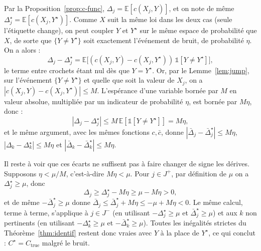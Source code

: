 \documentclass[11pt]{article}
\begin{document}
Par la Proposition~\ref{prop:c-func}, $\Delta_j = \mathbb{E}[c(X_j,Y)]$, et on note de même $\Delta_j^\star = \mathbb{E}[c(X_j,Y^\star)]$. Comme $X$ suit la même loi dans les deux cas (seule l'étiquette change), on peut coupler $Y$ et $Y^\star$ sur le même espace de probabilité que $X$, de sorte que $\{Y\ne Y^\star\}$ soit exactement l'événement de bruit, de probabilité $\eta$. On a alors :
$$\Delta_j - \Delta_j^\star = \mathbb{E}\big[(c(X_j,Y)-c(X_j,Y^\star))\,\mathbb{1}[Y\ne Y^\star]\big],$$
le terme entre crochets étant nul dès que $Y=Y^\star$. Or, par le Lemme~\ref{lem:jump}, sur l'événement $\{Y\ne Y^\star\}$ et quelle que soit la valeur de $X_j$, on a $|c(X_j,Y)-c(X_j,Y^\star)| \le M$. L'espérance d'une variable bornée par $M$ en valeur absolue, multipliée par un indicateur de probabilité $\eta$, est bornée par $M\eta$, donc :
$$|\Delta_j-\Delta_j^\star| \le M\,\mathbb{E}[\mathbb{1}[Y\ne Y^\star]] = M\eta,$$
et le même argument, avec les mêmes fonctions $c,\bar c$, donne $|\bar\Delta_j-\bar\Delta_j^\star| \le M\eta$, $|\Delta_k-\Delta_k^\star|\le M\eta$ et $|\bar\Delta_k-\bar\Delta_k^\star|\le M\eta$.

Il reste à voir que ces écarts ne suffisent pas à faire changer de signe les dérives. Supposons $\eta < \mu/M$, c'est-à-dire $M\eta < \mu$. Pour $j\in J^+$, par définition de $\mu$ on a $\Delta_j^\star \ge \mu$, donc
$$\Delta_j \ge \Delta_j^\star - M\eta \ge \mu - M\eta > 0,$$
et de même $-\bar\Delta_j^\star \ge \mu$ donne $\bar\Delta_j \le \bar\Delta_j^\star + M\eta \le -\mu + M\eta < 0$. Le même calcul, terme à terme, s'applique à $j\in J^-$ (en utilisant $-\Delta_j^\star\ge\mu$ et $\bar\Delta_j^\star\ge\mu$) et aux $k$ non pertinents (en utilisant $-\Delta_k^\star\ge\mu$ et $-\bar\Delta_k^\star\ge\mu$). Toutes les inégalités strictes du Théorème~\ref{thm:identif} restent donc vraies avec $Y$ à la place de $Y^\star$, ce qui conclut : $C^\star = C_{\text{true}}$ malgré le bruit.
\end{document}
